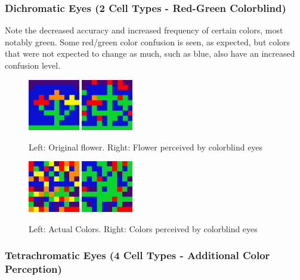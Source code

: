 \documentclass[titlepage]{article}
\begin{document}
\subsubsection{Dichromatic Eyes (2 Cell Types - Red-Green Colorblind)}

Note the decreased accuracy and increased frequency of certain colors, most notably green. Some red/green color confusion is seen, as expected, but colors that were not expected to change as much, such as blue, also have an increased confusion level.

\begin{figure}[H]
    \centering
    \includegraphics[width=0.2\textwidth]{figs/original_flower.png}
    \includegraphics[width=0.2\textwidth]{figs/flower_colorblind.png}
    \caption{Left: Original flower. Right: Flower perceived by colorblind eyes}
\end{figure}

\begin{figure}[H]
    \centering
    \includegraphics[width=0.2\textwidth]{figs/colorblind_actual_results.png}
    \includegraphics[width=0.2\textwidth]{figs/colorblind_predicted_results.png}
    \caption{Left: Actual Colors. Right: Colors perceived by colorblind eyes}
\end{figure}

\subsubsection{Tetrachromatic Eyes (4 Cell Types - Additional Color Perception)}
\end{document}
